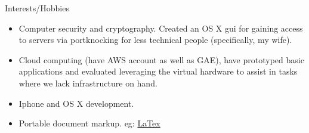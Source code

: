 \documentclass[11pt,oneside]{article}
\newenvironment{ressection}[1]{
        \vspace{4pt}
        {\fontfamily{phv}\selectfont\Large#1}
        \begin{itemize}
        \vspace{3pt}
}{
        \end{itemize}
}
\newcommand{\resitem}[1]{
        \vspace{-4pt}
        \item \begin{flushleft} #1 \end{flushleft}
}
\begin{document}
\begin{ressection}{Interests/Hobbies}

  \resitem{Computer security and cryptography. Created an OS X gui for
    gaining access to servers via portknocking for less technical
    people (specifically, my wife).}

  \resitem{Cloud computing (have AWS account as well as GAE), have
    prototyped basic applications and evaluated leveraging the virtual
    hardware to assist in tasks where we lack infrastructure on hand.}

  \resitem{Iphone and OS X development.}

  \resitem{Portable document markup. eg: \href{https://github.com/jstelzer/Resume/blob/master/stelzer-res.tex}{LaTex}}

\end{ressection}
\end{document}

